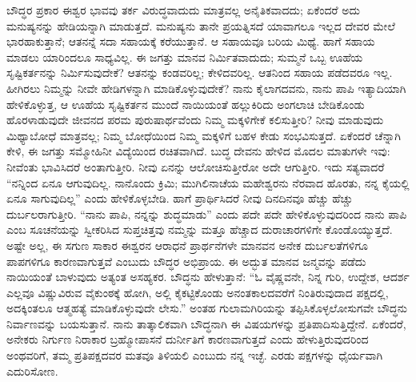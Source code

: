 ಬೌದ್ಧರ ಪ್ರಕಾರ ಈಶ್ವರ ಭಾವವು ತರ್ಕ ವಿರುದ್ಧವಾದುದು ಮಾತ್ರವಲ್ಲ ಅನೈತಿಕವಾದದು; ಏಕೆಂದರೆ ಅದು ಮನುಷ್ಯನನ್ನು ಹೇಡಿಯನ್ನಾಗಿ ಮಾಡುತ್ತದೆ. ಮನುಷ್ಯನು ತಾನೇ ಪ್ರಯತ್ನಿಸದೆ ಯಾವಾಗಲೂ ಇಲ್ಲದ ದೇವರ ಮೇಲೆ ಭಾರಹಾಕುತ್ತಾನೆ; ಆತನನ್ನೆ ಸದಾ ಸಹಾಯಕ್ಕೆ ಕರೆಯುತ್ತಾನೆ. ಆ ಸಹಾಯವೂ ಬರಿಯ ಮಿಥ್ಯೆ. ಹಾಗೆ ಸಹಾಯ ಮಾಡಲು ಯಾರಿಂದಲೂ ಸಾಧ್ಯವಿಲ್ಲ. ಈ ಜಗತ್ತು ಮಾನವ ನಿರ್ಮಿತವಾದುದು; ಸುಮ್ಮನೆ ಒಬ್ಬ ಊಹೆಯ ಸೃಷ್ಟಿಕರ್ತನನ್ನು ನಿರ್ಮಿಸುವುದೇಕೆ? ಆತನನ್ನು ಕಂಡವರಿಲ್ಲ; ಕೇಳಿದವರಿಲ್ಲ. ಆತನಿಂದ ಸಹಾಯ ಪಡೆದವರೂ ಇಲ್ಲ. ಹೀಗಿರಲು ನಿಮ್ಮನ್ನು ನೀವೇ ಹೇಡಿಗಳನ್ನಾಗಿ ಮಾಡಿಕೊಳ್ಳುವುದೇಕೆ? ನಾನು ಕೈಲಾಗದವನು, ನಾನು ಪಾಪಿ ಇತ್ಯಾದಿಯಾಗಿ ಹೇಳಿಕೊಳ್ಳುತ್ತ, ಆ ಊಹೆಯ ಸೃಷ್ಟಿಕರ್ತನ ಮುಂದೆ ನಾಯಿಯಂತೆ ಹಲ್ಲುಕಿರಿದು ಅಂಗಲಾಚಿ ಬೇಡಿಕೊಂಡು ಹೊರಳಾಡುವುದೇ ಜೀವನದ ಪರಮ ಪುರುಷಾರ್ಥವೆಂದು ನಿಮ್ಮ ಮಕ್ಕಳಿಗೇಕೆ ಕಲಿಸುತ್ತೀರಿ? ನೀವು ಮಾಡುವುದು ಮಿಥ್ಯಾಬೋಧೆ ಮಾತ್ರವಲ್ಲ; ನಿಮ್ಮ ಬೋಧೆಯಿಂದ ನಿಮ್ಮ ಮಕ್ಕಳಿಗೆ ಬಹಳ ಕೇಡು ಸಂಭವಿಸುತ್ತದೆ. ಏಕೆಂದರೆ ಚೆನ್ನಾಗಿ ಕೇಳಿ, ಈ ಜಗತ್ತು ಸಮ್ಮೋಹಿನೀ ವಿದ್ಯೆಯಿಂದ ರಚಿತವಾಗಿದೆ. ಬುದ್ಧ ದೇವನು ಹೇಳಿದ ಮೊದಲ ಮಾತುಗಳೇ ಇವು: ನೀವೆಂತು ಭಾವಿಸಿದರೆ ಅಂತಾಗುತ್ತೀರಿ. ನೀವು ಏನನ್ನು ಆಲೋಚಿಸುತ್ತೀರೋ ಅದೇ ಆಗುತ್ತೀರಿ. ಇದು ಸತ್ಯವಾದರೆ “ನನ್ನಿಂದ ಏನೂ ಆಗುವುದಿಲ್ಲ. ನಾನೊಂದು ಕ್ರಿಮಿ; ಮುಗಿಲಿನಾಚೆಯ ಮಹೇಶ್ವರನು ನೆರವಾದ ಹೊರತು, ನನ್ನ ಕೈಯಲ್ಲಿ ಏನೂ ಸಾಗುವುದಿಲ್ಲ” ಎಂದು ಹೇಳಿಕೊಳ್ಳಬೇಡಿ. ಹಾಗೆ ಪ್ರಾರ್ಥಿಸಿದರೆ ನೀವು ದಿನದಿನವೂ ಹೆಚ್ಚು ಹೆಚ್ಚು ದುರ್ಬಲರಾಗುತ್ತೀರಿ. “ನಾನು ಪಾಪಿ, ನನ್ನನ್ನು ಶುದ್ಧಮಾಡು” ಎಂದು ಪದೇ ಪದೇ ಹೇಳಿಕೊಳ್ಳುವುದರಿಂದ ನಾನು ಪಾಪಿ ಎಂಬ ಸೂಚನೆಯನ್ನು ಸ್ವೀಕರಿಸಿದ ಸುಪ್ತಚಿತ್ತವು ನಮ್ಮನ್ನು ಮತ್ತೂ ಹೆಚ್ಚಾದ ದುರಾಚಾರಗಳಿಗೇ ಕೊಂಡೊಯ್ಯುತ್ತದೆ. ಅಷ್ಟೇ ಅಲ್ಲ, ಈ ಸಗುಣ ಸಾಕಾರ ಈಶ್ವರನ ಆರಾಧನೆ ಪ್ರಾರ್ಥನೆಗಳೇ ಮಾನವನ ಅನೇಕ ದುರ್ಬಲತೆಗಳಿಗೂ ಪಾಪಗಳಿಗೂ ಕಾರಣವಾಗುತ್ತವೆ ಎಂಬುದು ಬೌದ್ಧರ ಅಭಿಪ್ರಾಯ. ಈ ಅದ್ಭುತ ಮಾನವ ಜನ್ಮವನ್ನು ಪಡೆದು ನಾಯಿಯಂತೆ ಬಾಳುವುದು ಅತ್ಯಂತ ಅಸಹ್ಯಕರ. ಬೌದ್ಧನು ಹೇಳುತ್ತಾನೆ: “ಓ ವೈಷ್ಣವನೇ, ನಿನ್ನ ಗುರಿ, ಉದ್ದೇಶ, ಆದರ್ಶ ಎಲ್ಲವೂ ವಿಷ್ಣುವಿರುವ ವೈಕುಂಠಕ್ಕೆ ಹೋಗಿ, ಅಲ್ಲಿ ಕೈಕಟ್ಟಿಕೊಂಡು ಅನಂತಕಾಲದವರೆಗೆ ನಿಂತಿರುವುದಾದ ಪಕ್ಷದಲ್ಲಿ, ಅದಕ್ಕಿಂತಲೂ ಆತ್ಮಹತ್ಯೆ ಮಾಡಿಕೊಳ್ಳುವುದೇ ಲೇಸು.” ಅಂತಹ ಗುಲಾಮಗಿರಿಯನ್ನು ತಪ್ಪಿಸಿಕೊಳ್ಳಲೋಸುಗವೇ ಬೌದ್ಧನು ನಿರ್ವಾಣವನ್ನು ಬಯಸುತ್ತಾನೆ. ನಾನು ತಾತ್ಕಾಲಿಕವಾಗಿ ಬೌದ್ಧನಾಗಿ ಈ ವಿಷಯಗಳನ್ನು ಪ್ರತಿಪಾದಿಸುತ್ತಿದ್ದೇನೆ. ಏಕೆಂದರೆ, ಅನೇಕರು ನಿರ್ಗುಣ ನಿರಾಕಾರ ಬ್ರಹ್ಮೋಪಾಸನೆ ದುರ್ನೀತಿಗೆ ಕಾರಣವಾಗುತ್ತದೆ ಎಂದು ಹೇಳುತ್ತಿರುವುದರಿಂದ ಅಂಥವರಿಗೆ, ತಮ್ಮ ಪ್ರತಿಪಕ್ಷದವರ ಮತವೂ ತಿಳಿಯಲಿ ಎಂಬುದು ನನ್ನ ಇಚ್ಛೆ. ಎರಡು ಪಕ್ಷಗಳನ್ನು ಧೈರ್ಯವಾಗಿ ಎದುರಿಸೋಣ. 

